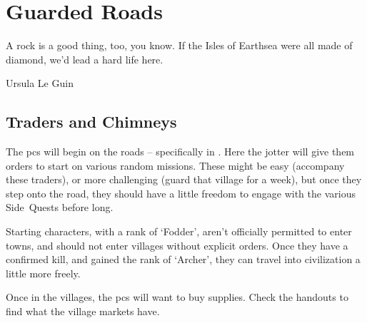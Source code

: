 \chapter{Guarded Roads}
\epigraph{A rock is a good thing, too, you know. If the Isles of Earthsea were all made of diamond, we'd lead a hard life here.}{Ursula Le Guin}

\section{Traders and Chimneys}

The \glspl{pc} will begin on the roads -- specifically in .
Here the \gls{jotter} will give them orders to start on various random missions.%
These might be easy (accompany these traders), or more challenging (guard that \gls{village} for a week), but once they step onto the road, they should have a little freedom to engage with the various Side~Quests before long.

Starting characters, with a rank of `Fodder',%
aren't officially permitted to enter towns, and should not enter \glspl{village} without explicit orders.
Once they have a confirmed kill, and gained the rank of `Archer', they can travel into civilization a little more freely.

Once in the \glspl{village}, the \glspl{pc} will want to buy supplies.
Check the handouts to find what the \gls{village} markets have.
